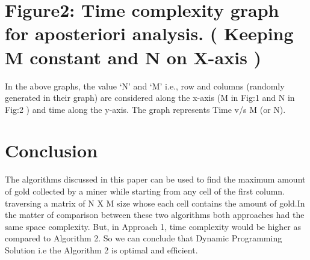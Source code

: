 \documentclass[conference]{IEEEtran}
\begin{document}



\section*{Figure2: Time complexity graph for aposteriori analysis. ( Keeping M constant and N on X-axis )}


\bigskip
In the above graphs, the value ‘N’ and ‘M’ i.e., row and columns (randomly generated in their graph) are considered along the x-axis (M in Fig:1 and N in Fig:2 ) and time along the y-axis. The graph represents Time v/s M (or N).


\section{Conclusion}
The algorithms discussed in this paper can be used to find the maximum amount of gold collected by a miner while starting from any cell of the first column. traversing a matrix of N X M size whose each cell contains the amount of gold.In the matter of comparison between these two algorithms both approaches had the same space complexity. But, in Approach 1, time complexity would be higher as compared to Algorithm 2. So we can conclude that Dynamic Programming Solution i.e the Algorithm 2 is optimal and efficient.
\end{document}
